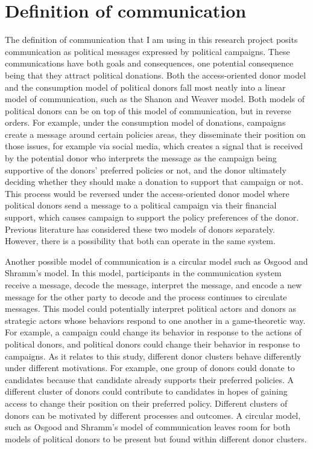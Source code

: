 \documentclass[12pt,]{article}
\begin{document}
\hypertarget{definition-of-communication}{%
\section{Definition of
communication}\label{definition-of-communication}}

The definition of communication that I am using in this research project
posits communication as political messages expressed by political
campaigns. These communications have both goals and consequences, one
potential consequence being that they attract political donations. Both
the access-oriented donor model and the consumption model of political
donors fall most neatly into a linear model of communication, such as
the Shanon and Weaver model. Both models of political donors can be on
top of this model of communication, but in reverse orders. For example,
under the consumption model of donations, campaigns create a message
around certain policies areas, they disseminate their position on those
issues, for example via social media, which creates a signal that is
received by the potential donor who interprets the message as the
campaign being supportive of the donors' preferred policies or not, and
the donor ultimately deciding whether they should make a donation to
support that campaign or not. This process would be reversed under the
access-oriented donor model where political donors send a message to a
political campaign via their financial support, which causes campaign to
support the policy preferences of the donor. Previous literature has
considered these two models of donors separately. However, there is a
possibility that both can operate in the same system.

Another possible model of communication is a circular model such as
Osgood and Shramm's model. In this model, participants in the
communication system receive a message, decode the message, interpret
the message, and encode a new message for the other party to decode and
the process continues to circulate messages. This model could
potentially interpret political actors and donors as strategic actors
whose behaviors respond to one another in a game-theoretic way. For
example, a campaign could change its behavior in response to the actions
of political donors, and political donors could change their behavior in
response to campaigns. As it relates to this study, different donor
clusters behave differently under different motivations. For example,
one group of donors could donate to candidates because that candidate
already supports their preferred policies. A different cluster of donors
could contribute to candidates in hopes of gaining access to change
their position on their preferred policy. Different clusters of donors
can be motivated by different processes and outcomes. A circular model,
such as Osgood and Shramm's model of communication leaves room for both
models of political donors to be present but found within different
donor clusters.
\end{document}
